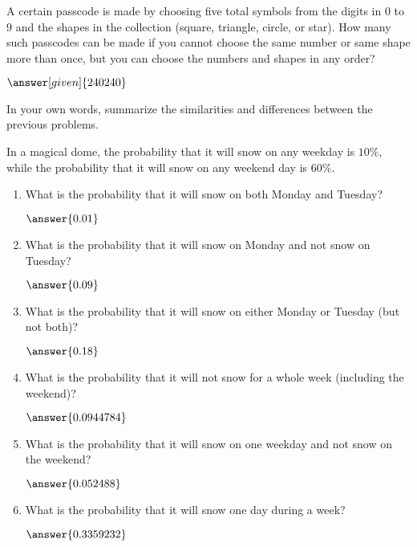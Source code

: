 \documentclass[nooutcomes]{ximera}
\begin{document}
\begin{problem}
A certain passcode is made by choosing five total symbols from the digits in $0$ to $9$ and the shapes in the collection (square, triangle, circle, or star).  How many such passcodes can be made if you cannot choose the same number or same shape more than once, but you can choose the numbers and shapes in any order?
\begin{prompt}
	$\answer[given]{240240}$ %
\end{prompt}
\end{problem}


\begin{problem}
In your own words, summarize the similarities and differences between the previous problems.

\begin{freeResponse}
\end{freeResponse}
\end{problem}



\begin{problem}
In a magical dome, the probability that it will snow on any weekday is $10\%$, while the probability that it will snow on any weekend day is $60\%$.

\begin{enumerate}
	\item What is the probability that it will snow on both Monday and Tuesday? \begin{prompt} $\answer{0.01}$ \end{prompt} %
	\item What is the probability that it will snow on Monday and not snow on Tuesday? \begin{prompt} $\answer{0.09}$ \end{prompt} %
	\item What is the probability that it will snow on either Monday or Tuesday (but not both)? \begin{prompt} $\answer{0.18}$ \end{prompt} %
	\item What is the probability that it will not snow for a whole week (including the weekend)? \begin{prompt} $\answer{0.0944784}$ \end{prompt} %
	\item What is the probability that it will snow on one weekday and not snow on the weekend? \begin{prompt} $\answer{0.052488}$ \end{prompt}  %
	\item What is the probability that it will snow one day during a week? \begin{prompt} $\answer{0.3359232}$ \end{prompt} %

\end{enumerate}
\end{problem}
\end{document}
